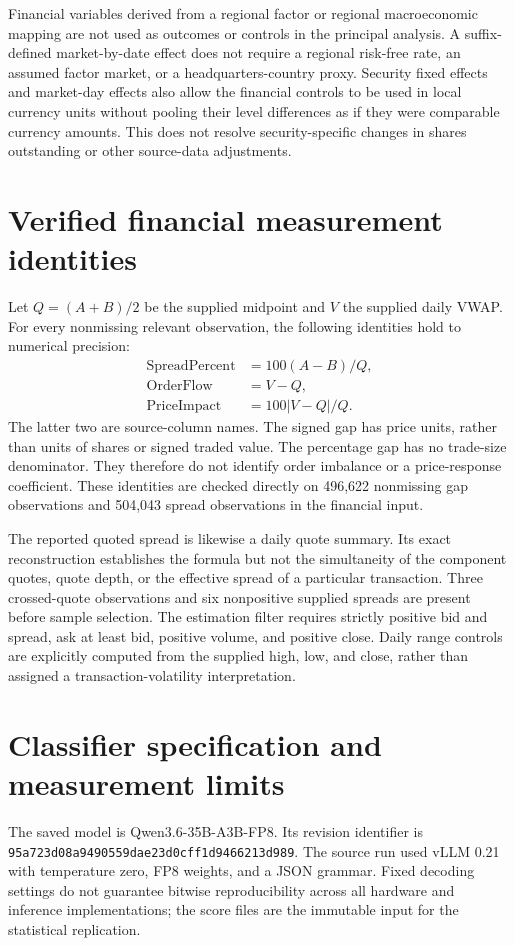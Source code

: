 \documentclass[11pt,a4paper]{article}
\begin{document}
Financial variables derived from a regional factor or regional macroeconomic mapping are not used as outcomes or controls in the principal analysis. A suffix-defined market-by-date effect does not require a regional risk-free rate, an assumed factor market, or a headquarters-country proxy. Security fixed effects and market-day effects also allow the financial controls to be used in local currency units without pooling their level differences as if they were comparable currency amounts. This does not resolve security-specific changes in shares outstanding or other source-data adjustments.

\section{Verified financial measurement identities}
Let $Q=(A+B)/2$ be the supplied midpoint and $V$ the supplied daily VWAP. For every nonmissing relevant observation, the following identities hold to numerical precision:
\begin{align}
\mathrm{SpreadPercent}&=100(A-B)/Q,\\
\mathrm{OrderFlow}&=V-Q,\\
\mathrm{PriceImpact}&=100\lvert V-Q\rvert/Q.
\end{align}
The latter two are source-column names. The signed gap has price units, rather than units of shares or signed traded value. The percentage gap has no trade-size denominator. They therefore do not identify order imbalance or a price-response coefficient. These identities are checked directly on 496,622 nonmissing gap observations and 504,043 spread observations in the financial input.

The reported quoted spread is likewise a daily quote summary. Its exact reconstruction establishes the formula but not the simultaneity of the component quotes, quote depth, or the effective spread of a particular transaction. Three crossed-quote observations and six nonpositive supplied spreads are present before sample selection. The estimation filter requires strictly positive bid and spread, ask at least bid, positive volume, and positive close. Daily range controls are explicitly computed from the supplied high, low, and close, rather than assigned a transaction-volatility interpretation.

\section{Classifier specification and measurement limits}
The saved model is Qwen3.6-35B-A3B-FP8. Its revision identifier is\\
\texttt{95a723d08a9490559dae23d0cff1d9466213d989}. The source run used vLLM 0.21 with temperature zero, FP8 weights, and a JSON grammar. Fixed decoding settings do not guarantee bitwise reproducibility across all hardware and inference implementations; the score files are the immutable input for the statistical replication.
\end{document}
